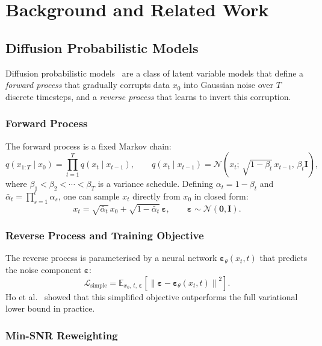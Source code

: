 \documentclass[12pt, a4paper, twoside]{report}
\newcommand{\eps}{\boldsymbol{\varepsilon}}
\newcommand{\calL}{\mathcal{L}}
\newcommand{\calN}{\mathcal{N}}
\newcommand{\E}{\mathbb{E}}
\begin{document}
\chapter{Background and Related Work}
\label{chap:background}

\section{Diffusion Probabilistic Models}
\label{sec:diffusion_background}

Diffusion probabilistic models~\cite{sohl2015deep,ho2020ddpm} are a class of
latent variable models that define a \emph{forward process} that gradually
corrupts data $x_0$ into Gaussian noise over $T$ discrete timesteps, and a
\emph{reverse process} that learns to invert this corruption.

\subsection{Forward Process}
\label{ssec:forward}

The forward process is a fixed Markov chain:
\[
  q(x_{1:T} \mid x_0) = \prod_{t=1}^{T} q(x_t \mid x_{t-1}), \qquad
  q(x_t \mid x_{t-1}) = \calN\!\left(x_t;\, \sqrt{1-\beta_t}\, x_{t-1},\, \beta_t \mathbf{I}\right),
\]
where $\beta_1 < \beta_2 < \cdots < \beta_T$ is a variance schedule.
Defining $\alpha_t = 1 - \beta_t$ and $\bar{\alpha}_t = \prod_{s=1}^{t} \alpha_s$,
one can sample $x_t$ directly from $x_0$ in closed form:
\[
  x_t = \sqrt{\bar{\alpha}_t}\, x_0 + \sqrt{1-\bar{\alpha}_t}\, \eps,
  \qquad \eps \sim \calN(\mathbf{0}, \mathbf{I}).
\]

\subsection{Reverse Process and Training Objective}
\label{ssec:reverse}

The reverse process is parameterised by a neural network
$\eps_\theta(x_t, t)$ that predicts the noise component $\eps$:
\[
  \calL_{\text{simple}} = \E_{x_0,\, t,\, \eps}\!\left[
    \left\|\eps - \eps_\theta(x_t, t)\right\|^2
  \right].
\]
Ho et al.~\cite{ho2020ddpm} showed that this simplified objective
outperforms the full variational lower bound in practice.

\subsection{Min-SNR Reweighting}
\label{ssec:min_snr}
\end{document}
